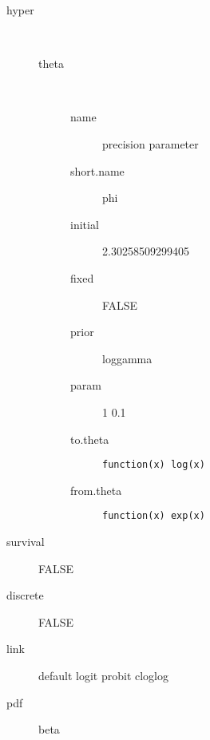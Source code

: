 \begin{description}
	\item[hyper]\ 
	 \begin{description}
	 	\item[theta]\ 
	 	 \begin{description}
	 	 	\item[name] precision parameter
	 	 	\item[short.name] phi
	 	 	\item[initial] 2.30258509299405
	 	 	\item[fixed] FALSE
	 	 	\item[prior] loggamma
	 	 	\item[param] 1 0.1
	 	 	\item[to.theta] \verb|function(x) log(x)|
	 	 	\item[from.theta] \verb|function(x) exp(x)|
	 	 \end{description}
	 \end{description}
	\item[survival] FALSE
	\item[discrete] FALSE
	\item[link] default logit probit cloglog
	\item[pdf] beta
\end{description}
